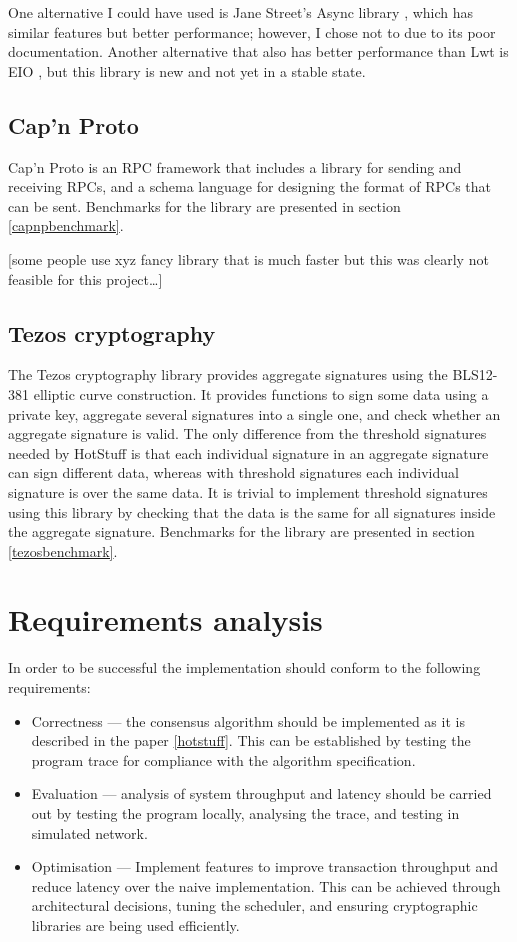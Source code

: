 One alternative I could have used is Jane Street's Async library \cite{noauthor_async_nodate}, which has similar features but better performance; however, I chose not to due to its poor documentation. Another alternative that also has better performance than Lwt is EIO \cite{noauthor_eio_2023}, but this library is new and not yet in a stable state.

\subsection{Cap'n Proto}
Cap'n Proto  \cite{noauthor_capn_nodate} is an RPC framework that includes a library for sending and receiving RPCs, and a schema language for designing the format of RPCs that can be sent. Benchmarks for the library are presented in section \ref{capnpbenchmark}.

[some people use xyz fancy library that is much faster but this was clearly not feasible for this project\dots]

\subsection{Tezos cryptography} \label{tezos}
The Tezos cryptography library \cite{noauthor_tezos_nodate} provides aggregate signatures using the BLS12-381 elliptic curve construction. It provides functions to sign some data using a private key, aggregate several signatures into a single one, and check whether an aggregate signature is valid. The only difference from the threshold signatures needed by HotStuff is that each individual signature in an aggregate signature can sign different data, whereas with threshold signatures each individual signature is over the same data. It is trivial to implement threshold signatures using this library by checking that the data is the same for all signatures inside the aggregate signature. Benchmarks for the library are presented in section \ref{tezosbenchmark}.

\section{Requirements analysis} \label{requirements}

In order to be successful the implementation should conform to the following requirements:
\begin{itemize}
	\item Correctness --- the consensus algorithm should be implemented as it is described in the paper \ref{hotstuff}. This can be established by testing the program trace for compliance with the algorithm specification.
	\item Evaluation --- analysis of system throughput and latency should be carried out by testing the program locally, analysing the trace, and testing in simulated network.
	\item Optimisation --- Implement features to improve transaction throughput and reduce latency over the naive implementation. This can be achieved through architectural decisions, tuning the scheduler, and ensuring cryptographic libraries are being used efficiently.
\end{itemize}

